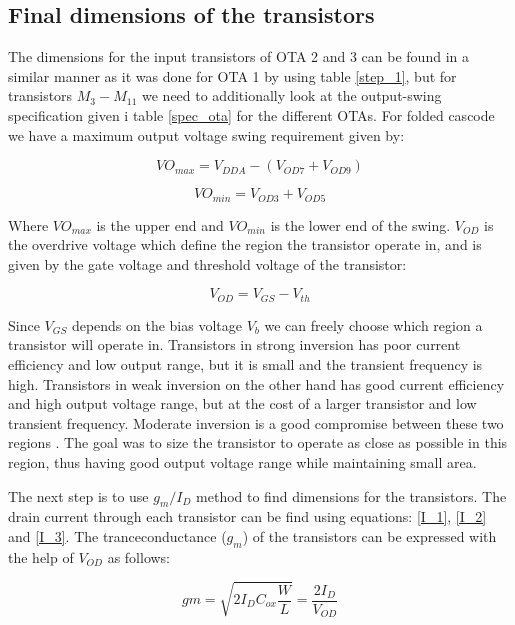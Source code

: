 \subsection{Final dimensions of the transistors}

The dimensions for the input transistors of OTA 2 and 3 can be found in a similar manner as it was done for OTA 1 by using table \ref{step_1}, but for transistors $M_3 - M_{11}$ we need to additionally  look at the output-swing specification given i table \ref{spec_ota} for the different OTAs. For folded cascode we have a maximum output voltage swing requirement given by\cite{Razavi}:

\begin{equation}
    VO_{max} = V_{DDA} - (V_{OD7} + V_{OD9})
\end{equation}

\begin{equation}
    VO_{min} = V_{OD3} + V_{OD5}
\end{equation}

Where $VO_{max}$ is the upper end and $VO_{min}$ is the lower end of the swing. $V_{OD}$ is the overdrive voltage which define the region the transistor operate in, and is given by the gate voltage and threshold voltage of the transistor:

\begin{equation}
    V_{OD} = V_{GS} - V_{th}
\end{equation}

Since $V_{GS}$ depends on the bias voltage $V_{b}$ we can freely choose which region a transistor will operate in. Transistors in strong inversion has poor current efficiency and low output range, but it is small and the transient frequency is high. Transistors in weak inversion on the other hand has good current efficiency and high output voltage range, but at the cost of a larger transistor and low transient frequency. Moderate inversion is a good compromise between these two regions \cite{gm_id_2}. The goal was to size the transistor to operate as close as possible in this region, thus having good output voltage range while maintaining small area. 

The next step is to use $g_m/I_D$ method to find dimensions for the transistors. The drain current through each transistor can be find using equations: \ref{I_1}, \ref{I_2} and \ref{I_3}. The tranceconductance ($g_m$) of the transistors can be expressed with the help of $V_{OD}$ as follows:

\begin{equation}
    gm = \sqrt{2I_DC_{ox}\frac{W}{L}} = \frac{2I_D}{V_{OD}}
\end{equation}

